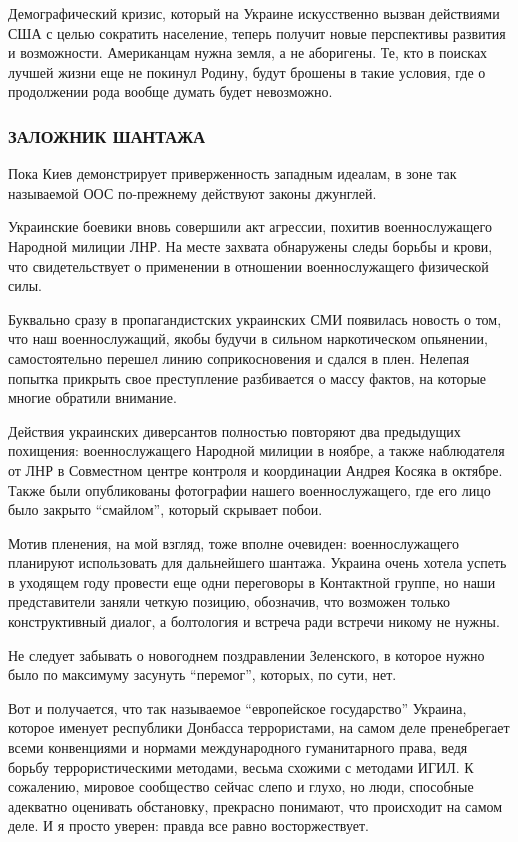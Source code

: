 Демографический кризис, который на Украине искусственно вызван действиями США с
целью сократить население, теперь получит новые перспективы развития и
возможности. Американцам нужна земля, а не аборигены. Те, кто в поисках лучшей
жизни еще не покинул Родину, будут брошены в такие условия, где о продолжении
рода вообще думать будет невозможно.

\subsubsection{ЗАЛОЖНИК ШАНТАЖА}

Пока Киев демонстрирует приверженность западным идеалам, в зоне так называемой
ООС по-прежнему действуют законы джунглей.

Украинские боевики вновь совершили акт агрессии, похитив военнослужащего
Народной милиции ЛНР. На месте захвата обнаружены следы борьбы и крови, что
свидетельствует о применении в отношении военнослужащего физической силы. 

Буквально сразу в пропагандистских украинских СМИ появилась новость о том, что
наш военнослужащий, якобы будучи в сильном наркотическом опьянении,
самостоятельно перешел линию соприкосновения и сдался в плен. Нелепая попытка
прикрыть свое преступление разбивается о массу фактов, на которые многие
обратили внимание. 

Действия украинских диверсантов полностью повторяют два предыдущих похищения:
военнослужащего Народной милиции в ноябре, а также наблюдателя от ЛНР в
Совместном центре контроля и координации Андрея Косяка в октябре. Также были
опубликованы фотографии нашего военнослужащего, где его лицо было закрыто
\enquote{смайлом}, который скрывает побои.

Мотив пленения, на мой взгляд, тоже вполне очевиден: военнослужащего планируют
использовать для дальнейшего шантажа. Украина очень хотела успеть в уходящем
году провести еще одни переговоры в Контактной группе, но наши представители
заняли четкую позицию, обозначив, что возможен только конструктивный диалог, а
болтология и встреча ради встречи никому не нужны. 

Не следует забывать о новогоднем поздравлении Зеленского, в которое нужно было
по максимуму засунуть \enquote{перемог}, которых, по сути, нет. 

Вот и получается, что так называемое \enquote{европейское государство} Украина,
которое именует республики Донбасса террористами, на самом деле пренебрегает
всеми конвенциями и нормами международного гуманитарного права, ведя борьбу
террористическими методами, весьма схожими с методами ИГИЛ.  К сожалению,
мировое сообщество сейчас слепо и глухо, но люди, способные адекватно оценивать
обстановку, прекрасно понимают, что происходит на самом деле. И я просто
уверен: правда все равно восторжествует.
